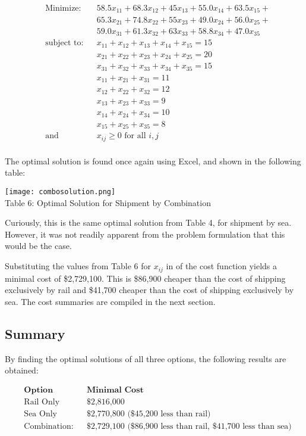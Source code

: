 \documentclass[12pt,letterpaper]{article}
\begin{document}
$$
\begin{aligned}
& \text{Minimize:}
& & 58.5x_{11} + 68.3x_{12} + 45x_{13} + 55.0x_{14} + 63.5x_{15} + \\
&&& 65.3x_{21} + 74.8x_{22} + 55x_{23} + 49.0x_{24} + 56.0x_{25} + \\
&&& 59.0x_{31} + 61.3x_{32} + 63x_{33} + 58.8x_{34} + 47.0x_{35} \\
& \text{subject to:}
& & x_{11} + x_{12} + x_{13} + x_{14} + x_{15} = 15 \\
&&& x_{21} + x_{22} + x_{23} + x_{24} + x_{25} = 20 \\
&&& x_{31} + x_{32} + x_{33} + x_{34} + x_{35} = 15 \\
&&& x_{11} + x_{21} + x_{31} = 11 \\
&&& x_{12} + x_{22} + x_{32} = 12 \\
&&& x_{13} + x_{23} + x_{33} = 9 \\
&&& x_{14} + x_{24} + x_{34} = 10 \\
&&& x_{15} + x_{25} + x_{35} = 8 \\
& \text{and}
& & x_{ij} \geq 0 \text{ for all } i, j \\
\end{aligned}
$$

The optimal solution is found once again using Excel, and shown in the following table:

\begin{center}
\texttt{[image: combosolution.png]}\\
Table 6: Optimal Solution for Shipment by Combination
\end{center}

Curiously, this is the same optimal solution from Table 4, for shipment by sea.  However, it was not readily apparent
from the problem formulation that this would be the case.

Substituting the values from Table 6 for $x_{ij}$ in of the cost function yields a minimal cost of \$2,729,100.  This
is \$86,900 cheaper than the cost of shipping exclusively by rail and \$41,700 cheaper than the cost of shipping
exclusively by sea.  The cost summaries are compiled in the next section.

\subsection{Summary}
By finding the optimal solutions of all three options, the following results are obtained:

$$
\begin{aligned}
& \textbf{Option}
& & \textbf{Minimal Cost} \\
& \text{Rail Only}
& & \text{\$2,816,000} \\
& \text{Sea Only}
& & \text{\$2,770,800 (\$45,200 less than rail)} \\
& \text{Combination:}
& & \text{\$2,729,100 (\$86,900 less than rail, \$41,700 less than sea)} \\
\end{aligned}
$$
\end{document}
